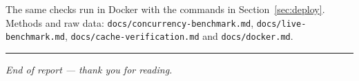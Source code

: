 \documentclass[11pt,a4paper]{article}
\newcommand{\cmd}[1]{\texttt{#1}}
\begin{document}
The same checks run in Docker with the commands in Section~\ref{sec:deploy}.
Methods and raw data: \cmd{docs/concurrency-benchmark.md},
\cmd{docs/live-benchmark.md}, \cmd{docs/cache-verification.md} and
\cmd{docs/docker.md}.

\vspace{1em}\hrule\vspace{0.6em}
\noindent\small\textit{End of report --- thank you for reading.}
\end{document}
